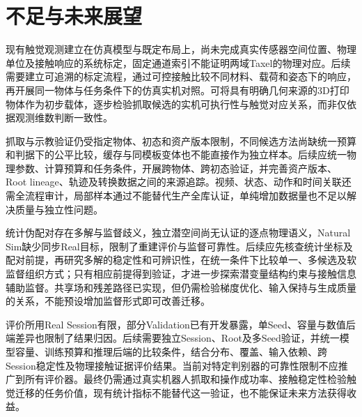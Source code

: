 \section{不足与未来展望}
\label{sec:ch07_limitations_future_work}

现有触觉观测建立在仿真模型与既定布局上，尚未完成真实传感器空间位置、物理单位及接触响应的系统标定，固定通道索引不能证明两域Taxel的物理对应。后续需要建立可追溯的标定流程，通过可控接触比较不同材料、载荷和姿态下的响应，再开展同一物体与任务条件下的仿真实机对照。可将具有明确几何来源的3D打印物体作为初步载体，逐步检验抓取候选的实机可执行性与触觉对应关系，而非仅依据观测维数判断一致性。

抓取与示教验证仍受指定物体、初态和资产版本限制，不同候选方法尚缺统一预算和判据下的公平比较，缓存与同模板变体也不能直接作为独立样本。后续应统一物理参数、计算预算和任务条件，开展跨物体、跨初态验证，并完善资产版本、Root lineage、轨迹及转换数据之间的来源追踪。视频、状态、动作和时间关联还需全流程审计，局部样本通过不能替代生产全库认证，单纯增加数据量也不足以解决质量与独立性问题。

统计伪配对存在多解与监督歧义，独立潜空间尚无认证的逐点物理语义，Natural Sim缺少同步Real目标，限制了重建评价与监督可靠性。后续应先核查统计坐标及配对前提，再研究多解的稳定性和可辨识性，在统一条件下比较单一、多候选及软监督组织方式；只有相应前提得到验证，才进一步探索潜变量结构约束与接触信息辅助监督。共享场和残差路径已实现，但仍需检验梯度优化、输入保持与生成质量的关系，不能预设增加监督形式即可改善迁移。

评价所用Real Session有限，部分Validation已有开发暴露，单Seed、容量与数值后端差异也限制了结果归因。后续需要独立Session、Root及多Seed验证，并统一模型容量、训练预算和推理后端的比较条件，结合分布、覆盖、输入依赖、跨Session稳定性及物理接触证据评价结果。当前对特定判别器的可靠性限制不应推广到所有评价器。最终仍需通过真实机器人抓取和操作成功率、接触稳定性检验触觉迁移的任务价值，现有统计指标不能替代这一验证，也不能保证未来方法获得收益。
